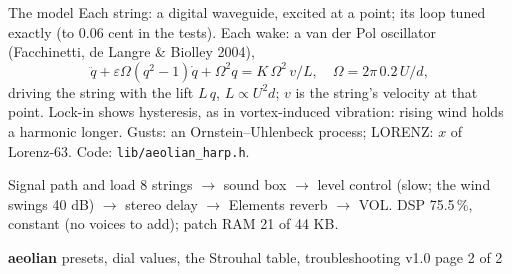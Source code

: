 \documentclass{article}
\begin{document}
\begin{minipage}[t]{64mm}\vspace{0pt}
\begin{card}{The model}
\fontsize{6.6}{7.8}\selectfont
Each string: a digital waveguide, excited at a point; its loop tuned exactly (to 0.06 cent in the tests).
Each wake: a van der Pol oscillator (Facchinetti, de Langre \& Biolley 2004),
\[ \ddot q + \varepsilon\Omega(q^2-1)\dot q + \Omega^2 q = K\,\Omega^2\,v/L, \quad \Omega = 2\pi\,0.2\,U/d, \]
driving the string with the lift \(L\,q\), \(L \propto U^2 d\); \(v\) is the string's velocity at that point. Lock-in shows
hysteresis, as in vortex-induced vibration: rising wind holds a harmonic longer. Gusts: an
Ornstein--Uhlenbeck process; LORENZ: \(x\) of Lorenz-63. Code: \texttt{lib/aeolian\_harp.h}.
\end{card}
\begin{card}{Signal path and load}
8 strings \(\to\) sound box \(\to\) level control (slow; the wind swings 40 dB) \(\to\) stereo delay \(\to\)
Elements reverb \(\to\) VOL. DSP 75.5\,\%, constant (no voices to add); patch RAM 21 of 44 KB.
\end{card}
\end{minipage}

\newpage
{\fontsize{16}{18}\selectfont\bfseries aeolian}\hspace{3mm}%
{\fontsize{9.5}{11}\selectfont presets, dial values, the Strouhal table, troubleshooting}\hfill
{\fontsize{7}{8}\selectfont\color{black!55} v1.0 \textperiodcentered{} page 2 of 2}
\end{document}
